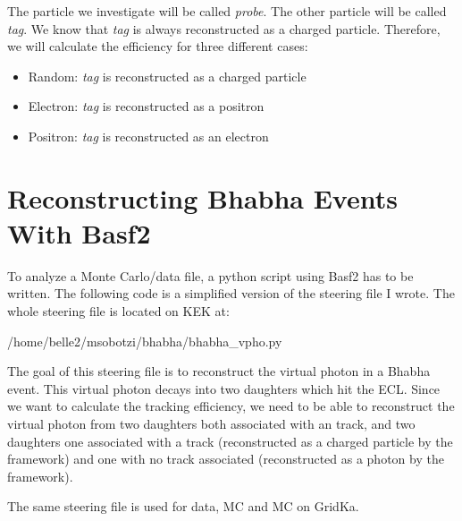 \documentclass[a4paper,11pt,twosided,final,german,openbib,pdftex,listof=totoc,bibliography=totoc]{scrbook}
\begin{document}
The particle we investigate will be called \textit{probe}. The other particle will be called \textit{tag}. We  know that \textit{tag} is always reconstructed as a charged particle. Therefore, we will calculate the efficiency for three different cases:

\begin{itemize}
	\item Random: \textit{tag} is reconstructed as a charged particle
	\item Electron: \textit{tag} is reconstructed as a positron
	\item Positron: \textit{tag} is reconstructed as an electron
\end{itemize}





\section{Reconstructing Bhabha Events With Basf2}
\label{sec:RecBasf2}


To analyze a Monte Carlo/data file, a python script using Basf2 has to be written. The following code is a simplified version of the steering file I wrote. 
The whole steering file is located on KEK at:
\newline 

/home/belle2/msobotzi/bhabha/bhabha\_vpho.py
\newline


The goal of this steering file is to reconstruct the virtual photon in a Bhabha event. This virtual photon decays into two daughters which hit the ECL. Since we want to calculate the tracking efficiency, we need to be able to reconstruct the virtual photon from two daughters both associated with an track, and two daughters one associated with a track (reconstructed as a charged particle by the framework) and one with no track associated (reconstructed as a photon by the framework).

The same steering file is used for data, MC and MC on GridKa. 
\newline 
\end{document}
